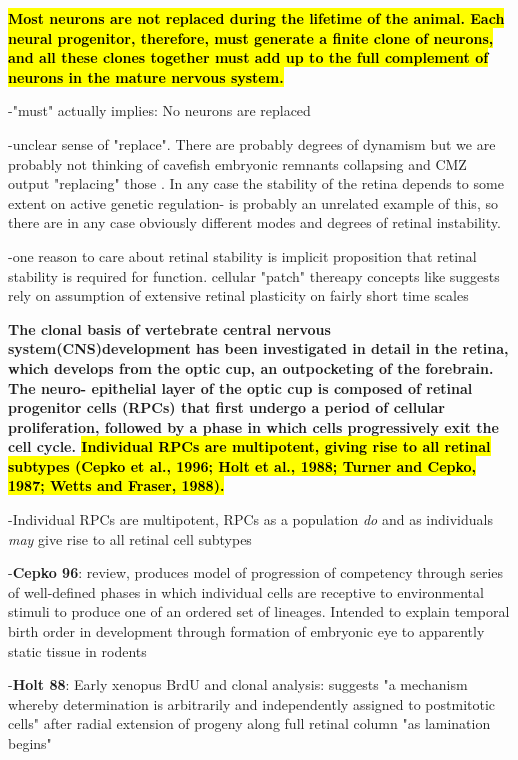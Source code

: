 \textbf{
\hl{Most neurons are not replaced during the lifetime of the animal.
Each neural progenitor, therefore, must generate a finite clone of
neurons, and all these clones together must add up to the full
complement of neurons in the mature nervous system.}
}

\bigskip

-"must" actually implies: No neurons are replaced

-unclear sense of "replace". There are probably degrees of dynamism but we are probably not thinking of cavefish embryonic remnants collapsing and CMZ output "replacing" those \cite{Strickler2002}. In any case the stability of the retina depends to some extent on active genetic regulation- \cite{Horsford2004} is probably an unrelated example of this, so there are in any case obviously different modes and degrees of retinal instability.

-one reason to care about retinal stability is implicit proposition that retinal stability is required for function. cellular "patch" thereapy concepts like \cite{Nakano2012} suggests rely on assumption of extensive retinal plasticity on fairly short time scales

\bigskip
	\textbf{
The clonal basis of vertebrate central nervous system(CNS)development 
has been investigated in detail in the retina, which develops
from the optic cup, an outpocketing of the forebrain. The neuro-
epithelial layer of the optic cup is composed of retinal progenitor
cells (RPCs) that first undergo a period of cellular proliferation,
followed by a phase in which cells progressively exit the cell
cycle. \hl{Individual RPCs are multipotent, giving rise to all retinal
subtypes (Cepko et al., 1996; Holt et al., 1988; Turner and
Cepko, 1987; Wetts and Fraser, 1988).}}

\bigskip

-Individual RPCs are multipotent, RPCs as a population \textit{do} and as individuals \textit{may} give rise to all retinal cell subtypes

-\textbf{Cepko 96\cite{Cepko1996}}: review, produces model of progression of competency through series of well-defined phases in which individual cells are receptive to environmental stimuli to produce one of an ordered set of lineages. Intended to explain temporal birth order in development through formation of embryonic eye to apparently static tissue in rodents

-\textbf{Holt 88\cite{Holt1988}}: Early xenopus BrdU and clonal analysis: suggests "a mechanism whereby determination is arbitrarily and independently assigned to postmitotic cells" after radial extension of progeny along full retinal column "as lamination begins"

